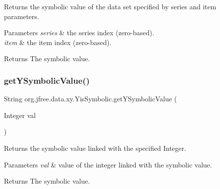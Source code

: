 Returns the symbolic value of the data set specified by {\ttfamily series} and {\ttfamily item} parameters.


\begin{DoxyParams}{Parameters}
{\em series} & the series index (zero-\/based). \\
\hline
{\em item} & the item index (zero-\/based).\\
\hline
\end{DoxyParams}
\begin{DoxyReturn}{Returns}
The symbolic value. 
\end{DoxyReturn}
\mbox{\label{interfaceorg_1_1jfree_1_1data_1_1xy_1_1_yis_symbolic_a922b9681be541b311e32ddb7fc3430c9}} 
\subsubsection{\texorpdfstring{get\+Y\+Symbolic\+Value()}{getYSymbolicValue()}\hspace{0.1cm}{\footnotesize\ttfamily [2/2]}}
{\footnotesize\ttfamily String org.\+jfree.\+data.\+xy.\+Yis\+Symbolic.\+get\+Y\+Symbolic\+Value (\begin{DoxyParamCaption}\item[{Integer}]{val }\end{DoxyParamCaption})}

Returns the symbolic value linked with the specified {\ttfamily Integer}.


\begin{DoxyParams}{Parameters}
{\em val} & value of the integer linked with the symbolic value.\\
\hline
\end{DoxyParams}
\begin{DoxyReturn}{Returns}
The symbolic value. 
\end{DoxyReturn}
\mbox{\label{interfaceorg_1_1jfree_1_1data_1_1xy_1_1_yis_symbolic_af964830a0f66c63c671df4d347b16fc3}} 
